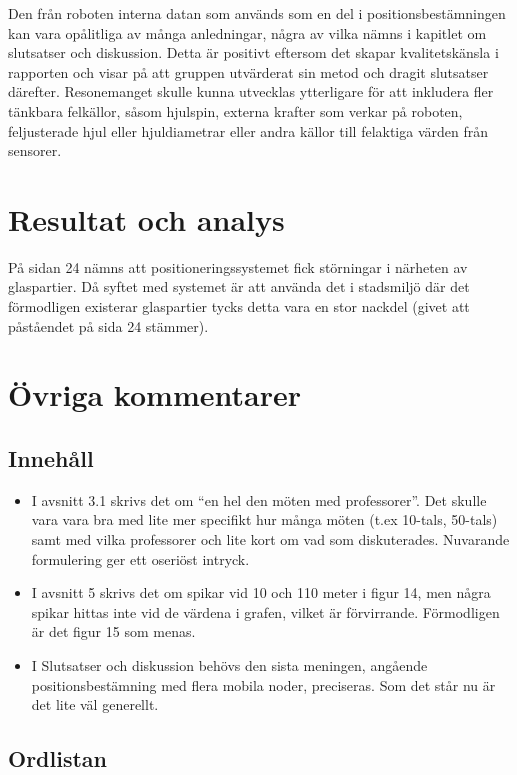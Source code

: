 \documentclass[a4paper,11pt]{article}
\begin{document}
Den från roboten interna datan som används som en del i positionsbestämningen kan vara opålitliga av många anledningar, några av vilka nämns i kapitlet om slutsatser och diskussion. Detta är positivt eftersom det skapar kvalitetskänsla i rapporten och visar på att gruppen utvärderat sin metod och dragit slutsatser därefter. Resonemanget skulle kunna utvecklas ytterligare för att inkludera fler tänkbara felkällor, såsom hjulspin, externa krafter som verkar på roboten, feljusterade hjul eller hjuldiametrar eller andra källor till felaktiga värden från sensorer. \\

\section{Resultat och analys}

På sidan 24 nämns att positioneringssystemet fick störningar i närheten av glaspartier. Då syftet med systemet är att använda det i stadsmiljö där det förmodligen existerar glaspartier tycks detta vara en stor nackdel (givet att påståendet på sida 24 stämmer). \\

\section{Övriga kommentarer}

\subsection{Innehåll}

\begin{itemize}
   \item I avsnitt 3.1 skrivs det om “en hel den möten med professorer”. Det skulle vara vara bra med lite mer specifikt hur många möten (t.ex 10-tals, 50-tals) samt med vilka professorer och lite kort om vad som diskuterades. Nuvarande formulering ger ett oseriöst intryck.
   \item I avsnitt 5 skrivs det om spikar vid 10 och 110 meter i figur 14, men några spikar hittas inte vid de värdena i grafen, vilket är förvirrande. Förmodligen är det figur 15 som menas.
   \item I Slutsatser och diskussion behövs den sista meningen, angående positionsbestämning med flera mobila noder, preciseras. Som det står nu är det lite väl generellt. 
\end{itemize}

\subsection{Ordlistan}
\end{document}
